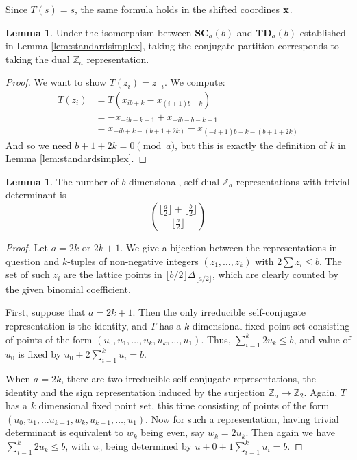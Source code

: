 \documentclass{amsart}[12pt]
\theoremstyle{definition}
\newtheorem{lemma}[dummy]{Lemma}
\newcommand{\Z}{\mathbb{Z}}
\newcommand{\SC}{\mathbf{SC}}
\newcommand{\TD}{\mathbf{TD}}
\begin{document}
Since $T(s)=s$, the same formula holds in the shifted coordines $\bf{x}$. 



\begin{lemma} \label{lem:conjugatedual}
Under the isomorphism between $\SC_a(b)$ and $\TD_a(b)$ established in Lemma \ref{lem:standardsimplex}, taking the conjugate partition corresponds to taking the dual $\Z_a$ representation.
\end{lemma}

\begin{proof}
We want to show $T(z_i)=z_{-i}$.  We compute:
\begin{align*}
T(z_i)&=T(x_{ib+k}-x_{(i+1)b+k}) \\
&=-x_{-ib-k-1}+x_{-ib-b-k-1} \\
& =x_{-ib+k-(b+1+2k)}-x_{(-i+1)b+k-(b+1+2k)}
\end{align*}
And so we need $b+1+2k=0\pmod a$, but this is exactly the definition of $k$ in Lemma \ref{lem:standardsimplex}.
\end{proof}



\begin{lemma} \label{lem:conjugatecount}
The number of $b$-dimensional, self-dual $\Z_a$ representations with trivial determinant is $$\binom{\big\lfloor\frac{a}{2}\big\rfloor+\big\lfloor\frac{b}{2}\big\rfloor}{\big\lfloor\frac{a}{2}\big\rfloor}$$
\end{lemma}

\begin{proof}
  Let $a=2k$ or $2k+1$.  We give a bijection between the representations in question and $k$-tuples of non-negative integers $(z_1,\dots, z_k)$ with $2\sum z_i\leq b$.  The set of such $z_i$ are the lattice points in $\lfloor b/2\rfloor\Delta_{\lfloor a/2\rfloor}$, which are clearly counted by the given binomial coefficient.

First, suppose that $a=2k+1$.  Then the only irreducible self-conjugate representation is the identity, and $T$ has a $k$ dimensional fixed point set consisting of points of the form $(u_0, u_1,\dots, u_k,u_k,\dots, u_1)$.  Thus, $\sum_{i=1}^k 2u_k\leq b$, and value of $u_0$ is fixed by $u_0+2\sum_{i=1}^k u_i=b$.

When $a=2k$, there are two irreducible self-conjugate representations, the identity and the sign representation induced by the surjection $\Z_a\to\Z_2$.  Again, $T$ has a $k$ dimensional fixed point set, this time consisting of points of the form $(u_0, u_1,\dots u_{k-1}, w_{k}, u_{k-1},\dots,u_1)$.  Now for such a representation, having trivial determinant is equivalent to $w_k$ being even, say $w_k=2u_k$.  Then again we have $\sum_{i=1}^k 2u_k\leq b$, with $u_0$ being determined by $u+0+1\sum_{i=1}^{k}u_i=b$. 
\end{proof}
\end{document}
